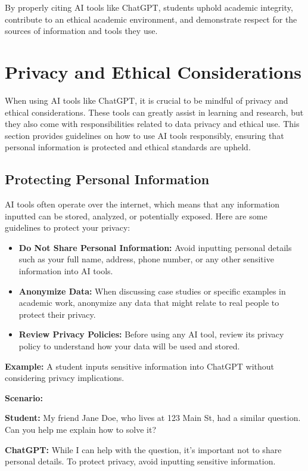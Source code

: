 \documentclass{article}
\begin{document}
By properly citing AI tools like ChatGPT, students uphold academic integrity, contribute to an ethical academic environment, and demonstrate respect for the sources of information and tools they use.


\section{Privacy and Ethical Considerations}

When using AI tools like ChatGPT, it is crucial to be mindful of privacy and ethical considerations. These tools can greatly assist in learning and research, but they also come with responsibilities related to data privacy and ethical use. This section provides guidelines on how to use AI tools responsibly, ensuring that personal information is protected and ethical standards are upheld.

\subsection{Protecting Personal Information}

AI tools often operate over the internet, which means that any information inputted can be stored, analyzed, or potentially exposed. Here are some guidelines to protect your privacy:

\begin{itemize}
    \item \textbf{Do Not Share Personal Information:} Avoid inputting personal details such as your full name, address, phone number, or any other sensitive information into AI tools.
    \item \textbf{Anonymize Data:} When discussing case studies or specific examples in academic work, anonymize any data that might relate to real people to protect their privacy.
    \item \textbf{Review Privacy Policies:} Before using any AI tool, review its privacy policy to understand how your data will be used and stored.
\end{itemize}

\textbf{Example:} A student inputs sensitive information into ChatGPT without considering privacy implications.

\textbf{Scenario:}
\begin{mdframed}
\begin{flushleft}
\textbf{Student:} My friend Jane Doe, who lives at 123 Main St, had a similar question. Can you help me explain how to solve it?

\textbf{ChatGPT:} While I can help with the question, it's important not to share personal details. To protect privacy, avoid inputting sensitive information.
\end{flushleft}
\end{mdframed}
\end{document}
